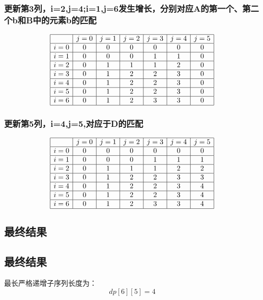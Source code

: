 \documentclass{article}
\begin{document}
\subsubsection*{更新第3列，i=2,j=4;i=1,j=6发生增长，分别对应A的第一个、第二个b和B中的元素b的匹配}
\[
\begin{array}{|c|c|c|c|c|c|c|}
\hline
    & j=0 & j=1 & j=2 & j=3 & j=4 & j=5 \\ \hline
i=0 & 0   & 0   & 0   & 0   & 0   & 0   \\ \hline
i=1 & 0   & 0   & 0   & 1   & 1   & 0   \\ \hline
i=2 & 0   & 1   & 1   & 1   & 2   & 0   \\ \hline
i=3 & 0   & 1   & 2   & 2   & 3   & 0   \\ \hline
i=4 & 0   & 1   & 2   & 2   & 3  & 0   \\ \hline
i=5 & 0   & 1   & 2   & 2   & 3  & 0   \\ \hline
i=6 & 0   & 1   & 2   & 3   & 3   & 0   \\ \hline
\end{array}
\]
\subsubsection*{更新第5列，i=4,j=5,对应于D的匹配}
\[
\begin{array}{|c|c|c|c|c|c|c|}
\hline
    & j=0 & j=1 & j=2 & j=3 & j=4 & j=5 \\ \hline
i=0 & 0   & 0   & 0   & 0   & 0   & 0   \\ \hline
i=1 & 0   & 0   & 0   & 1   & 1   & 1   \\ \hline
i=2 & 0   & 1   & 1   & 1   & 2   & 2   \\ \hline
i=3 & 0   & 1   & 2   & 2   & 3   & 3   \\ \hline
i=4 & 0   & 1   & 2   & 2   & 3   & 4   \\ \hline
i=5 & 0   & 1   & 2   & 2   & 3   & 4   \\ \hline
i=6 & 0   & 1   & 2   & 3   & 3   & 4  \\ \hline
\end{array}
\]

\subsection*{最终结果}


\subsection{最终结果}
最长严格递增子序列长度为：
\[
dp[6][5] =4
\]
\end{document}
